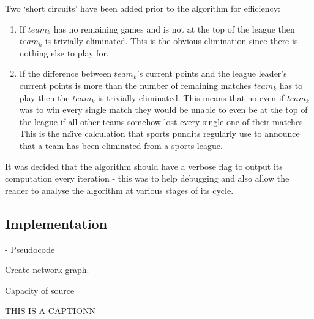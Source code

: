 Two `short circuits' have been added prior to the algorithm for efficiency:
\begin{enumerate}
\item If $team_k$ has no remaining games and is not at the top of the league
then $team_k$ is trivially eliminated. This is the obvious elimination since
there is nothing else to play for.
\item If the difference between $team_k$'s current points and the league 
leader's current points is more than the number of remaining matches $team_k$ 
has to play then the $team_k$ is trivially eliminated. This means that no even 
if $team_k$ was to win every single match they would be unable to even be at 
the top of the league if all other teams somehow lost every single one of their 
matches. This is the na\"{\i}ve calculation that sports pundits regularly use 
to announce that a team has been eliminated from a sports league.
\end{enumerate}

It was decided that the algorithm should have a verbose flag to output
its computation every iteration - this was to help debugging and also
allow the reader to analyse the algorithm at various stages of its
cycle. 

\subsection{Implementation}

- Pseudocode



\begin{algorithm}[H]
                               
  \SetAlgoLined
  
  
  
  Create network graph.
  
  Capacity of source 
  
  \caption{THIS IS A CAPTIONN}
\end{algorithm}